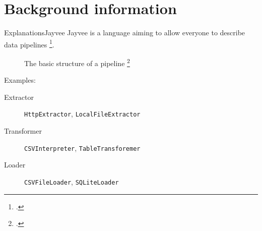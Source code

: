 \section{Background information} %
\begin{frame}[t]{Explanations}{Jayvee}
	Jayvee is a language aiming to allow everyone to describe data pipelines \footcite{jvalue:jayvee}.
	\begin{figure}[h]
		\begin{center}
			
		\end{center}
		\caption{The basic structure of a pipeline \footcite{jvalue:jayvee:docs:core_concepts}}
	\end{figure}
	\pause
	Examples:
	\begin{description}
		\item[Extractor] \Verb|HttpExtractor|, \Verb|LocalFileExtractor|
		\item[Transformer] \Verb|CSVInterpreter|, \Verb|TableTransforemer|
		\item[Loader] \Verb|CSVFileLoader|, \Verb|SQLiteLoader|
	\end{description}
\end{frame}


